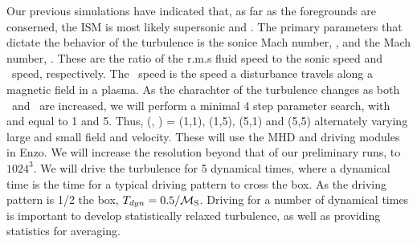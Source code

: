 Our previous simulations have indicated that, as far as the foregrounds are
conserned, the ISM is most likely supersonic and \sa.  The primary parameters
that dictate the behavior of the turbulence is the sonice Mach number, \mach,
and the \alf Mach number, \alfmach.  These are the ratio of the r.m.s fluid
speed to the sonic speed and \alf\ speed, respectively.  The \alf\ speed is the
speed a disturbance travels along a magnetic field in a plasma.  As the
charachter of the turbulence changes as both \mach\ and \alfmach\ are increased,
we will perform a minimal 4 step parameter search, with \mach and \alfmach equal
to 1 and 5.  Thus, (\mach, \alfmach) = (1,1), (1,5), (5,1) and (5,5) alternately
varying large and small field and velocity.  These will use the MHD and driving
modules in Enzo.  We will increase the resolution beyond that of our preliminary
runs, to $1024^3$.  We will drive the turbulence for 5 dynamical times, where a
dynamical time is the time for a typical driving pattern to cross the box.  As
the driving pattern is 1/2 the box, $T_{dyn}=0.5/\mathcal{M_{\rm{S}}}$.  Driving for a number
of dynamical times is important to develop statistically relaxed turbulence, as
well as providing statistics for averaging.  
